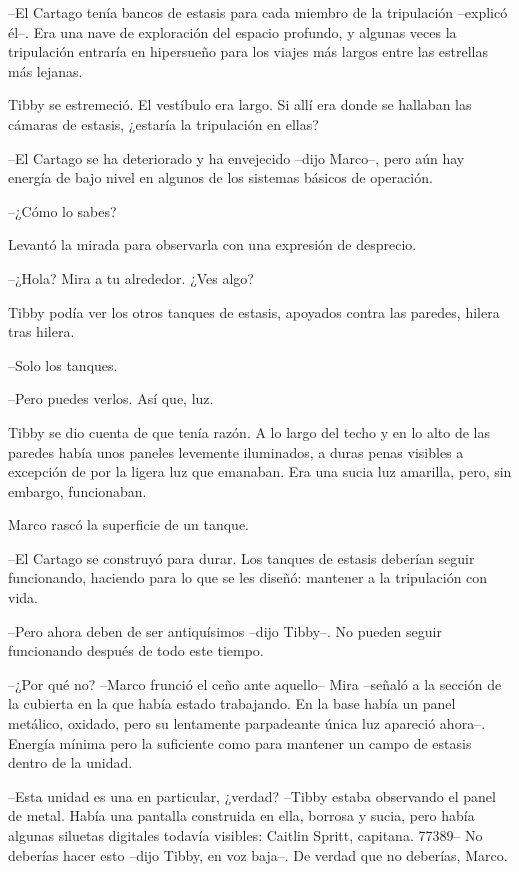 {--El Cartago tenía bancos de estasis para cada miembro de la tripulación
 --explicó él--. Era una nave de exploración del espacio profundo, y
 algunas veces la tripulación entraría en hipersueño para los viajes más
largos entre las estrellas más lejanas.}

{Tibby se estremeció. El vestíbulo era largo. Si allí era donde se
hallaban las cámaras de estasis, ¿estaría la tripulación en ellas?}

{--El Cartago se ha deteriorado y ha envejecido --dijo Marco--, pero aún
 hay energía de bajo nivel en algunos de los sistemas básicos de
operación.}

{--¿Cómo lo sabes?}

{Levantó la mirada para observarla con una expresión de desprecio.}

{--¿Hola? Mira a tu alrededor. ¿Ves algo?}

{Tibby podía ver los otros tanques de estasis, apoyados contra las
paredes, hilera tras hilera.}

{--Solo los tanques.}

{--Pero puedes verlos. Así que, luz.}

{Tibby se dio cuenta de que tenía razón. A lo largo del techo y en lo
 alto de las paredes había unos paneles levemente iluminados, a duras
 penas visibles a excepción de por la ligera luz que emanaban. Era una
sucia luz amarilla, pero, sin embargo, funcionaban.}

{Marco rascó la superficie de un tanque.}

{--El Cartago se construyó para durar. Los tanques de estasis deberían
 seguir funcionando, haciendo para lo que se les diseñó: mantener a la
tripulación con vida.}

{--Pero ahora deben de ser antiquísimos --dijo Tibby--. No pueden seguir
funcionando después de todo este tiempo.}

{--¿Por qué no? --Marco frunció el ceño ante aquello-- Mira --señaló a la
 sección de la cubierta en la que había estado trabajando. En la base
 había un panel metálico, oxidado, pero su lentamente parpadeante única
 luz apareció ahora--. Energía mínima pero la suficiente como para
mantener un campo de estasis dentro de la unidad.}

{--Esta unidad es una en particular, ¿verdad? --Tibby estaba observando
 el panel de metal. Había una pantalla construida en ella, borrosa y
 sucia, pero había algunas siluetas digitales todavía visibles: Caitlin
 Spritt, capitana. 77389-- No deberías hacer esto --dijo Tibby, en voz
baja--. De verdad que no deberías, Marco.}

